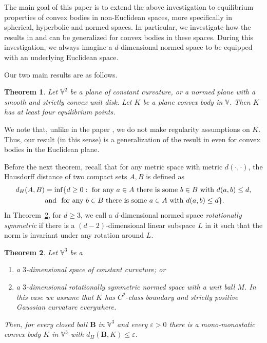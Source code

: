 \documentclass[twoside]{amsart}
\theoremstyle{plain}
\newtheorem{theorem}{Theorem}[section]
\theoremstyle{definition}
\numberwithin{equation}{section}
\newcommand{\BB}{\mathbf B}
\newcommand{\V}{\mathbb{V}}
\begin{document}
The main goal of this paper is to extend the above investigation to equilibrium properties of convex bodies in non-Euclidean spaces, more specifically in spherical, hyperbolic and normed spaces. In particular, we investigate how the results in \cite{DPR} and \cite{VD} can be generalized for convex bodies in these spaces. During this investigation, we always imagine a $d$-dimensional normed space to be equipped with an underlying Euclidean space.

Our two main results are as follows.

\begin{theorem}\label{thm:2d}
Let $\V^2$ be a plane of constant curvature, or a normed plane with a smooth and strictly convex unit disk. Let $K$ be a plane convex body in $\mathbb{V}$. Then $K$ has at least four equilibrium points.
\end{theorem}

We note that, unlike in the paper \cite{DPR}, we do not make regularity assumptions on $K$. Thus, our result (in this sense) is a generalization of the result in \cite{DPR} even for convex bodies in the Euclidean plane.

Before the next theorem, recall that for any metric space with metric $d(\cdot,\cdot)$, the Hausdorff distance of two compact sets $A,B$ is defined as
\begin{multline*}
d_H(A,B)= \inf \{ d \geq 0: \hbox{ for any } a \in A \hbox{ there is some } b \in B \hbox{ with } d(a,b) \leq d,\\
\hbox{ and } \hbox{ for any } b \in B \hbox{ there is some } a \in A \hbox{ with } d(a,b) \leq d \}.
\end{multline*}
In Theorem~\ref{thm:3d}, for $d \geq 3$, we call a $d$-dimensional normed space \emph{rotationally symmetric} if there is a  $(d-2)$-dimensional linear subspace $L$ in it such that the norm is invariant under any rotation around $L$.


\begin{theorem}\label{thm:3d}
Let $\V^3$ be a
\begin{enumerate}
\item[(a)] a $3$-dimensional space of constant curvature; or
\item[(b)] a $3$-dimensional rotationally symmetric normed space with a unit ball $M$. In this case we assume that $K$ has $C^2$-class boundary and strictly positive Gaussian curvature everywhere.
\end{enumerate}
Then, for every closed ball $\BB$ in $\V^3$ and every $\varepsilon > 0$ there is a mono-monostatic convex body $K$ in $\V^3$ with $d_H(\BB,K) \leq \varepsilon$.
\end{theorem}
\end{document}
